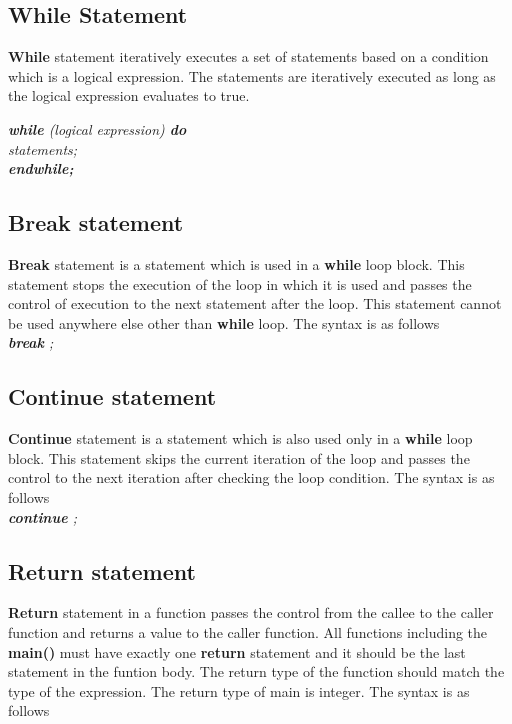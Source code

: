\documentclass[11pt]{article}
\begin{document}
\subsection{While Statement}
\textbf{While} statement iteratively executes a set of statements based on a condition which is a logical expression.  The statements are iteratively executed as long as the logical expression evaluates to true.

\textit{
\textbf{while} (logical expression) \textbf{do}  \\
 \indent \indent statements; \\
\indent \textbf{endwhile;}  \\
}

\subsection{Break statement}
\textbf{Break} statement is a statement which is used in a \textbf{while} loop block. This statement stops the execution of the loop in which it is used and passes the control of execution to the next statement after the loop. This statement cannot be used anywhere else other than \textbf{while} loop. The syntax is as follows\\

\textit{\textbf{break} ;}

\subsection{Continue statement}
\textbf{Continue} statement is a statement which is also used only in a \textbf{while} loop block. This statement skips the current iteration of the loop and passes the control to the next iteration after checking the loop condition. The syntax is as follows\\

\textit{\textbf{continue} ;}



\subsection{Return statement}
\textbf{Return} statement in a function passes the control from the callee to the caller function and returns a value to the caller function. All functions including the \textbf{main()} must have exactly one \textbf{return} statement and it should be the last statement in the funtion body. The return type of the function should match the type of the expression. The return type of main is integer. The syntax is as follows\\
\end{document}
